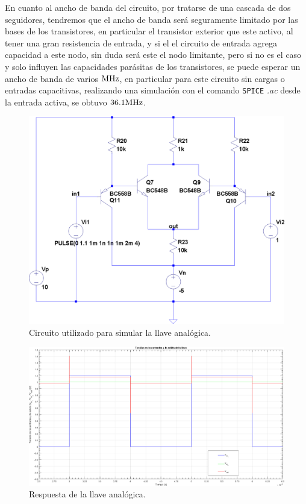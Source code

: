 En cuanto al ancho de banda del circuito, por tratarse de una cascada de dos seguidores, tendremos que el ancho de banda será seguramente limitado por las bases de los transistores, en particular el transistor exterior que este activo, al tener una gran resistencia de entrada, y si el el circuito de entrada agrega capacidad a este nodo, sin duda será este el nodo limitante, pero si no es el caso y solo influyen las capacidades parásitas de los transistores, se puede esperar un ancho de banda de varios $\si[per-mode=symbol]{\mega\hertz}$, en particular para este circuito sin cargas o entradas capacitivas, realizando una simulación con el comando \texttt{SPICE} \textit{.ac} desde la entrada activa, se obtuvo $36.1 \si[per-mode=symbol]{\mega\hertz}$.


\vfill

\clearpage

\begin{figure}[H] %
\begin{center}
\includegraphics[width=1 \textwidth, angle=0]{./img/llave/OR-Q7-9-10-11.png}
\caption{\label{fig:fig_analogic_switch}\footnotesize{Circuito utilizado para simular la llave analógica.}}
\end{center}
\end{figure}

\vfill

\clearpage


\begin{figure}[H] %
\begin{center}
\includegraphics[width=1.2 \textwidth, angle=90]{./img/llave/switch_response.png}
\caption{\label{fig:fig_analogic_switch_simulation}\footnotesize{Respuesta de la llave analógica.}}
\end{center}
\end{figure}

\clearpage